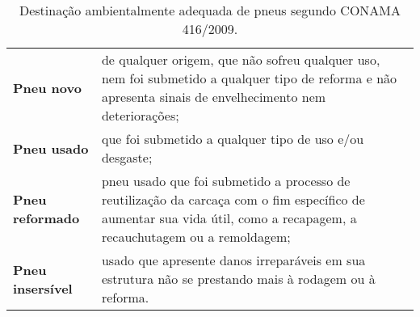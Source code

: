 \begin{table}[htbp]
  \centering
  \caption{Destinação ambientalmente adequada de pneus segundo CONAMA 416/2009.}
    \begin{tabular}{P{7.43em}|P{28.855em}}
     \textbf{Pneu novo} & de qualquer origem, que não sofreu qualquer uso, nem foi submetido a qualquer tipo de reforma e não apresenta sinais de envelhecimento nem deteriorações; \\
     \textbf{Pneu usado} & que foi submetido a qualquer tipo de uso e/ou desgaste; \\
     \textbf{Pneu reformado} & pneu usado que foi submetido a processo de reutilização da carcaça com o fim específico de aumentar sua vida útil, como a recapagem, a recauchutagem ou a remoldagem; \\
     \textbf{Pneu insersível} & usado que apresente danos irreparáveis em sua estrutura não se prestando mais à rodagem ou à reforma. \\
    \end{tabular}%
  \label{tab:destinacao_pneus}%
\end{table}%
